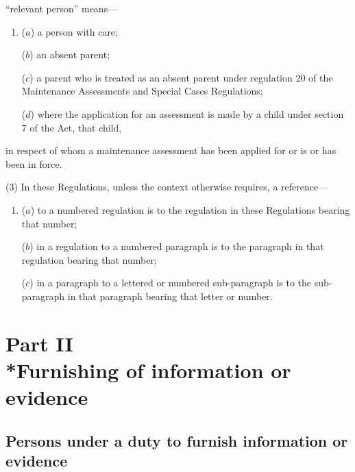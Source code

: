 \documentclass[a4paper,12pt]{article}
\begin{document}
\begin{enumerate}
“relevant person” means—
\begin{enumerate}\item[]
($a$) a person with care;

($b$) an absent parent;

($c$) a parent who is treated as an absent parent under regulation 20 of the Maintenance Assessments and Special Cases Regulations;

($d$) where the application for an assessment is made by a child under section 7 of the Act, that child,
\end{enumerate}
in respect of whom a maintenance assessment has been applied for or is or has been in force.
\end{enumerate}

(3) In these Regulations, unless the context otherwise requires, a reference—
\begin{enumerate}\item[]
($a$) to a numbered regulation is to the regulation in these Regulations bearing that number;

($b$) in a regulation to a numbered paragraph is to the paragraph in that regulation bearing that number;

($c$) in a paragraph to a lettered or numbered sub-paragraph is to the sub-paragraph in that paragraph bearing that letter or number.
\end{enumerate}

\section[Part II --- Furnishing of information or evidence]{Part II\\*Furnishing of information or evidence}

\renewcommand\parthead{--- Part II}

\subsection[2. Persons under a duty to furnish information or evidence]{Persons under a duty to furnish information or evidence}
\end{document}
